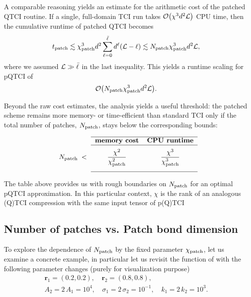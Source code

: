 A comparable reasoning yields an estimate for the arithmetic cost of the patched QTCI routine. If a single, full-domain TCI run takes  $\mathcal{O}\bigl( \chi^3 d^2 \mathcal{L} \bigr)$ CPU time, then the cumulative runtime of patched QTCI becomes
\begin{equation}
	t_{\text{patch}} \lesssim \chi_{\text{patch}}^3 d^2 \sum_{\ell = 0}^{{\bar \ell}} d^\ell (\mathcal{L} - \ell) \lesssim  N_{\text{patch}} \chi_{\text{patch}}^3 d^2 \mathcal{L},
\end{equation}
where we assumed $\mathcal{L} \gg {\bar \ell}$ in the last inequality. This yields a runtime scaling for pQTCI of 
\begin{equation}
	\mathcal{O}\bigl(N_{\text{patch}} \chi_{\text{patch}}^3 d^2 \mathcal{L}\bigr).
	\label{eq:PatchTimeScaling}
\end{equation}

Beyond the raw cost estimates, the analysis yields a useful threshold: the patched scheme remains more memory- or time-efficient than standard TCI only if the total number of patches, $N_{\text{patch}}$, stays below the corresponding bounds:

\begin{equation}
  \begin{tabular}{ccc}
    \cline{2-3}
      & \textbf{memory cost} & \textbf{CPU runtime} \\ \cline{2-3} \\[-6pt]
    $\Np\;<$ &
      $\displaystyle \frac{\chi^{2}}{\chi_{\text{patch}}^{2}}$ &
      $\displaystyle \frac{\chi^{3}}{\chi_{\text{patch}}^{3}}$ \\[15pt]\cline{2-3}
  \end{tabular}
  \label{eq:chiPatchBound}
\end{equation}

The table above provides us with rough boundaries on $N_{\text{patch}}$ for an optimal pQTCI approximation. In this particular context, $\chi$ is the rank of an analogous (Q)TCI compression with the same input tensor of p(Q)TCI




\subsection{Number of patches vs. Patch bond dimension}
To explore the dependence of $N_{\text{patch}}$ by the fixed parameter $\chi_{\text{patch}}$, let us examine a concrete example, in particular let us revisit the function of  with the following parameter changes (purely for visualization purpose)
\begin{equation}
	\label{eq:localFuncNewParams}
\begin{gathered}
	\boldsymbol{r}_{1} = ( 0.2, 0.2), \quad \boldsymbol{r}_{2} = ( 0.8, 0.8),\\[6pt]
	A_2 = 2\, A_1 = 10^4, \quad \sigma_1 = 2\, \sigma_2 = 10^{-1}, \quad k_1 = 2\, k_2 = 10^3. 	
\end{gathered}
\end{equation}

